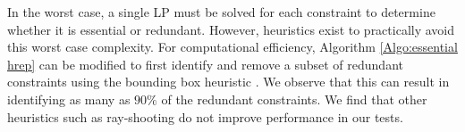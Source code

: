 In the worst case, a single LP must be solved for each constraint to determine whether it is essential or redundant. However, heuristics exist to practically avoid this worst case complexity. For computational efficiency, Algorithm \ref{Algo:essential hrep} can be modified to first identify and remove a subset of redundant constraints using the bounding box heuristic \cite{morari}. We observe that this can result in identifying as many as $90\%$ of the redundant constraints. We find that other heuristics such as ray-shooting do not improve performance in our tests.




